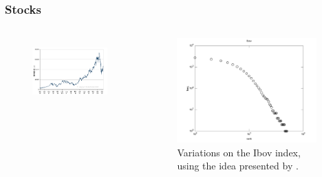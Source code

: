 \documentclass{beamer}
\begin{document}
\frame
{
  \frametitle{Stocks}

  \begin{columns}[c]
     \begin{figure}[h!]
     \centering
     \includegraphics[width=\textwidth]{imagespresentation/bovespa.png}
     \label{fig:bovespa}
     \end{figure}
     \begin{figure}[h!]
     \centering
     \includegraphics[width=0.95\textwidth]{imagespresentation/ibov.pdf}
     \caption{Variations on the Ibov index, using the idea presented by \cite{mandelbrot1963}.}
     \label{fig:glaeserzipf}
     \end{figure}
  \end{columns}
}
\end{document}
